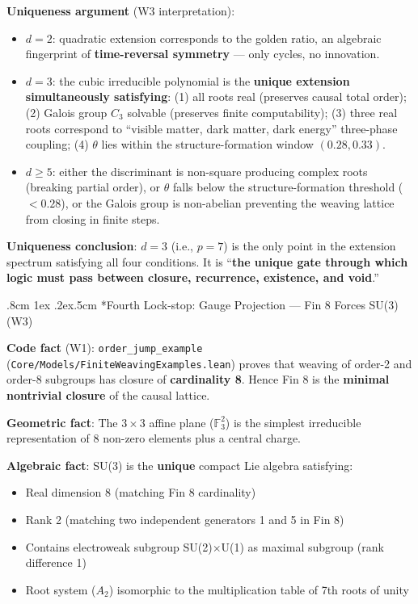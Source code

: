 \documentclass[aps,prd,twocolumn,nofootinbib,floatfix]{revtex4-2}
\makeatletter
\def\subsubsection{%
  \@startsection{subsubsection}{3}{\z@}
    {.8cm \@plus1ex \@minus .2ex}{.5cm}
    {\normalfont\normalsize\itshape\centering}%
}
\makeatother
\begin{document}
\textbf{Uniqueness argument} (W3 interpretation):
\begin{itemize}
    \item $d=2$: quadratic extension corresponds to the golden ratio, an algebraic fingerprint of \textbf{time-reversal symmetry} --- only cycles, no innovation.
    \item $d=3$: the cubic irreducible polynomial is the \textbf{unique extension simultaneously satisfying}: (1) all roots real (preserves causal total order); (2) Galois group $C_3$ solvable (preserves finite computability); (3) three real roots correspond to ``visible matter, dark matter, dark energy'' three-phase coupling; (4) $\theta$ lies within the structure-formation window $(0.28, 0.33)$.
    \item $d\geq 5$: either the discriminant is non-square producing complex roots (breaking partial order), or $\theta$ falls below the structure-formation threshold ($<0.28$), or the Galois group is non-abelian preventing the weaving lattice from closing in finite steps.
\end{itemize}

\textbf{Uniqueness conclusion}: $d=3$ (i.e., $p=7$) is the only point in the extension spectrum satisfying all four conditions. It is ``\textbf{the unique gate through which logic must pass between closure, recurrence, existence, and void}.''

\subsubsection*{Fourth Lock-stop: Gauge Projection --- Fin 8 Forces SU(3) (W3)}

\textbf{Code fact} (W1): \texttt{order\_jump\_example} (\texttt{Core/Models/FiniteWeavingExamples.lean}) proves that weaving of order-2 and order-8 subgroups has closure of \textbf{cardinality 8}. Hence Fin 8 is the \textbf{minimal nontrivial closure} of the causal lattice.

\textbf{Geometric fact}: The $3\times 3$ affine plane ($\mathbb{F}_3^2$) is the simplest irreducible representation of 8 non-zero elements plus a central charge.

\textbf{Algebraic fact}: SU(3) is the \textbf{unique} compact Lie algebra satisfying:
\begin{itemize}
    \item Real dimension 8 (matching Fin 8 cardinality)
    \item Rank 2 (matching two independent generators 1 and 5 in Fin 8)
    \item Contains electroweak subgroup SU(2)$\times$U(1) as maximal subgroup (rank difference 1)
    \item Root system ($A_2$) isomorphic to the multiplication table of 7th roots of unity
\end{itemize}
\end{document}
